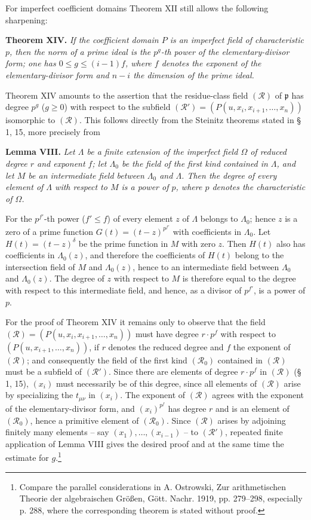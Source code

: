 \documentclass[11pt]{article}
\providecommand{\frakp}{\mathfrak p}
\begin{document}
For imperfect coefficient domains Theorem XII still allows the following sharpening:

\textbf{Theorem XIV.} \emph{If the coefficient domain $P$ is an imperfect field of characteristic $p$, then the norm of a prime ideal is the $p^g$-th power of the elementary-divisor form; one has $0\le g\le(i-1)f$, where $f$ denotes the exponent of the elementary-divisor form and $n-i$ the dimension of the prime ideal.}

Theorem XIV amounts to the assertion that the residue-class field $(\mathcal R)$ of $\frakp$ has degree $p^g$ ($g\ge0$) with respect to the subfield $(\mathcal R')=(P(u,x_i,x_{i+1},\ldots,x_n))$ isomorphic to $(\mathcal R)$. This follows directly from the Steinitz theorems stated in § 1, 15, more precisely from

\textbf{Lemma VIII.} \emph{Let $\Lambda$ be a finite extension of the imperfect field $\Omega$ of reduced degree $r$ and exponent $f$; let $\Lambda_0$ be the field of the first kind contained in $\Lambda$, and let $M$ be an intermediate field between $\Lambda_0$ and $\Lambda$. Then the degree of every element of $\Lambda$ with respect to $M$ is a power of $p$, where $p$ denotes the characteristic of $\Omega$.}

For the $p^{f'}$-th power ($f'\le f$) of every element $z$ of $\Lambda$ belongs to $\Lambda_0$; hence $z$ is a zero of a prime function $G(t)=(t-z)^{p^{f'}}$ with coefficients in $\Lambda_0$. Let $H(t)=(t-z)^\delta$ be the prime function in $M$ with zero $z$. Then $H(t)$ also has coefficients in $\Lambda_0(z)$, and therefore the coefficients of $H(t)$ belong to the intersection field of $M$ and $\Lambda_0(z)$, hence to an intermediate field between $\Lambda_0$ and $\Lambda_0(z)$. The degree of $z$ with respect to $M$ is therefore equal to the degree with respect to this intermediate field, and hence, as a divisor of $p^{f'}$, is a power of $p$.

For the proof of Theorem XIV it remains only to observe that the field $(\mathcal R)=(P(u,x_i,x_{i+1},\ldots,x_n))$ must have degree $r\cdot p^f$ with respect to $(P(u,x_{i+1},\ldots,x_n))$, if $r$ denotes the reduced degree and $f$ the exponent of $(\mathcal R)$; and consequently the field of the first kind $(\mathcal R_0)$ contained in $(\mathcal R)$ must be a subfield of $(\mathcal R')$. Since there are elements of degree $r\cdot p^f$ in $(\mathcal R)$ (§ 1, 15), $(x_i)$ must necessarily be of this degree, since all elements of $(\mathcal R)$ arise by specializing the $t_{\mu\nu}$ in $(x_i)$. The exponent of $(\mathcal R)$ agrees with the exponent of the elementary-divisor form, and $(x_i)^{p^f}$ has degree $r$ and is an element of $(\mathcal R_0)$, hence a primitive element of $(\mathcal R_0)$. Since $(\mathcal R)$ arises by adjoining finitely many elements -- say $(x_1),\ldots,(x_{i-1})$ -- to $(\mathcal R')$, repeated finite application of Lemma VIII gives the desired proof and at the same time the estimate for $g$.\footnote{Compare the parallel considerations in A. Ostrowski, Zur arithmetischen Theorie der algebraischen Größen, Gött. Nachr. 1919, pp. 279--298, especially p. 288, where the corresponding theorem is stated without proof.}
\end{document}
